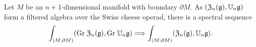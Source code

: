 \documentclass[11pt]{amsart}
\numberwithin{equation}{section}
\begin{document}
\begin{prp}
Let $M$ be an $n+1$-dimensional manifold with boundary $\partial M$. 
As $(\frak{Z}_n(\mathfrak g), \mathbb U_n \mathfrak g)$ form a filtered algebra over the Swiss cheese operad, 
there is a spectral sequence
\[
\int_{(M,\partial M)} ({\rm Gr}\; \frak{Z}_n(\mathfrak g), {\rm Gr}\; \mathbb U_n \mathfrak g) \Longrightarrow \int_{(M,\partial M)} (\frak{Z}_n(\mathfrak g), \mathbb U_n \mathfrak g).
\]
\end{prp}

  


%  
\end{document}
